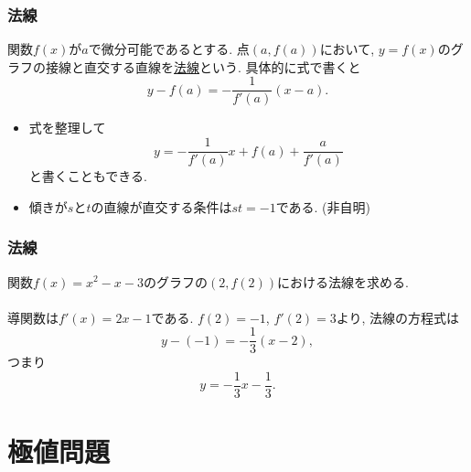 




\begin{frame}
\frametitle{法線}


\begin{Def}
関数$f(x)$が$a$で微分可能であるとする. 
点$(a,f(a))$において, $y=f(x)$のグラフの接線と直交する直線を\underline{法線}という. 
具体的に式で書くと
$$
y-f(a)=-\frac{1}{f'(a)}(x-a). 
$$
\end{Def}
\begin{itemize}
\item 式を整理して
$$
y=-\frac{1}{f'(a)}x + f(a) +\frac{a}{f'(a)}
$$
と書くこともできる.  
\item 傾きが$s$と$t$の直線が直交する条件は$st=-1$である. (非自明)
\end{itemize}

\end{frame}









\begin{frame}
\frametitle{法線}


関数$f(x)=x^2-x-3$のグラフの$(2,f(2))$における法線を求める. \\
\ \\

導関数は$f'(x)=2x-1$である. 
$f(2)=-1$, $f'(2)=3$より, 法線の方程式は
$$
y-(-1)=-\frac{1}{3}(x-2), 
$$
つまり
$$
y=-\frac{1}{3}x-\frac{1}{3}.  
$$




\end{frame}





\section{極値問題}



